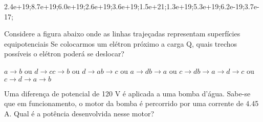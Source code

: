 \documentclass[12pt, addpoints]{exam}
\begin{document}
\begin{questions}
\begin{multicols*}{2}
\begin{oneparchoices}
\choice 2.4e+19;\choice 8.7e+19;\choice 6.0e+19;\choice 2.6e+19;\choice 3.6e+19;\choice 1.5e+21;\choice 1.3e+19;\choice 5.3e+19;\choice 6.2e-19;\choice 3.7e-17;\end{oneparchoices}
\question[20] Considere a figura abaixo onde as linhas trajeçadas representam superfícies equipotenciais Se colocarmos um elétron próximo a carga Q, quais trechos possíveis o elétron poderá se deslocar?
        
        \begin{center}
            \begin{minipage}[c]{0.5\linewidth}
            \end{minipage}
        \end{center}
        
        

\begin{choices}
\choice $a\rightarrow b$ ou $d\rightarrow c$\choice $c\rightarrow b$ ou $d\rightarrow a$\choice $b\rightarrow c$ ou $a\rightarrow d$\choice $b\rightarrow a$ ou $c\rightarrow d$\choice $b\rightarrow a\rightarrow d\rightarrow c$ ou $c\rightarrow d\rightarrow a\rightarrow b$\end{choices}
\question[20] Uma diferença de potencial de 120 V é aplicada a uma bomba d’água. Sabe-se que em funcionamento, o motor da bomba é percorrido por uma corrente de    4.45 A. Qual é a potência desenvolvida nesse motor?


\end{multicols*}
\end{questions}
\end{document}
